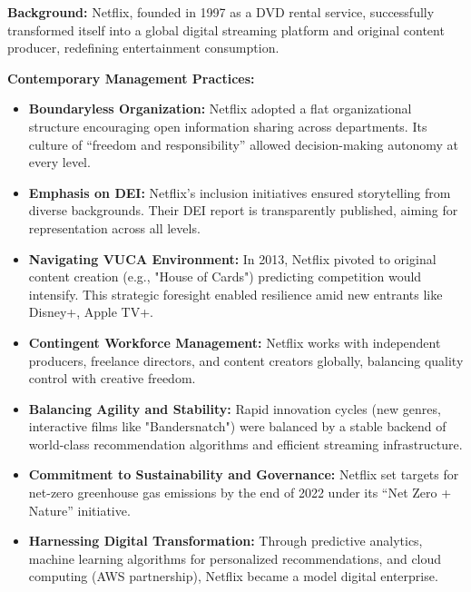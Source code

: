 \documentclass[10pt,a4paper]{book}
\begin{document}
\vspace{1cm}
\clearpage

\textbf{Background:}  
Netflix, founded in 1997 as a DVD rental service, successfully transformed itself into a global digital streaming platform and original content producer, redefining entertainment consumption.

\vspace{0.5cm}

\textbf{Contemporary Management Practices:}

\begin{itemize}

    \item \textbf{Boundaryless Organization:}  
    Netflix adopted a flat organizational structure encouraging open information sharing across departments. Its culture of “freedom and responsibility” allowed decision-making autonomy at every level.

    \item \textbf{Emphasis on DEI:}  
    Netflix’s inclusion initiatives ensured storytelling from diverse backgrounds. Their DEI report is transparently published, aiming for representation across all levels.

    \item \textbf{Navigating VUCA Environment:}  
    In 2013, Netflix pivoted to original content creation (e.g., "House of Cards") predicting competition would intensify. This strategic foresight enabled resilience amid new entrants like Disney+, Apple TV+.

    \item \textbf{Contingent Workforce Management:}  
    Netflix works with independent producers, freelance directors, and content creators globally, balancing quality control with creative freedom.

    \item \textbf{Balancing Agility and Stability:}  
    Rapid innovation cycles (new genres, interactive films like "Bandersnatch") were balanced by a stable backend of world-class recommendation algorithms and efficient streaming infrastructure.

    \item \textbf{Commitment to Sustainability and Governance:}  
    Netflix set targets for net-zero greenhouse gas emissions by the end of 2022 under its “Net Zero + Nature” initiative.

    \item \textbf{Harnessing Digital Transformation:}  
    Through predictive analytics, machine learning algorithms for personalized recommendations, and cloud computing (AWS partnership), Netflix became a model digital enterprise.

\end{itemize}
\end{document}
